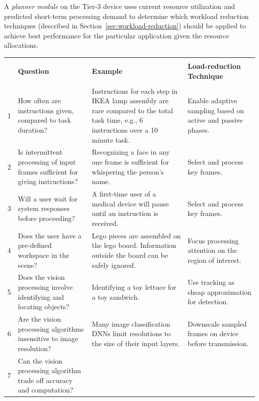 A {\em planner module} on the Tier-3 device uses current resource
utilization and predicted short-term processing demand to determine
which workload reduction techniques (described in
Section~\ref{sec:workload-reduction}) should be applied to achieve
best performance for the particular application given the resource
allocations.

\begin{table}[]
    \small
    \begin{tabular}{|r|p{35ex}|p{43ex}|p{32ex}|}
    \hline&&&\\[0.1in]
    &{\normalsize\bf Question}  & {\normalsize\bf Example} & {\normalsize\bf Load-reduction Technique} \\
    & & & \\ 
    \hline
    1&How often are instructions given, compared to task duration? 
        & Instructions for each step in IKEA lamp assembly are 
            rare compared to the total task time, e.g., 6 instructions over 
            a 10 minute task.
        & Enable adaptive sampling based on active and passive phases. \\ \hline
    2&Is intermittent processing of input frames sufficient for giving instructions?
        & Recognizing a face in any one frame is sufficient for
whispering the person's name.
        & Select and process key frames.  \\ \hline
    3&Will a user wait for system responses before proceeding?  
        & A first-time user of a medical device will pause until  an instruction is received.
        & Select and process key frames. \\ \hline
    4&Does the user have a pre-defined workspace in the scene?
        & Lego pieces are assembled on the lego board. Information outside the board can
             be safely ignored.
        & Focus processing attention on the region of interest. \\ \hline
    5&Does the vision processing involve identifying and locating objects?
        & Identifying a toy lettuce for a toy sandwich.
        & Use tracking as cheap approximation for detection. \\ \hline
    6&Are the vision processing algorithms insensitive to image resolution?
        & Many image classification DNNs limit resolutions to  
            the size of their input layers.
        & Downscale sampled frames on device before transmission.    \\ \hline
    7&Can the vision processing algorithm trade off accuracy and computation? 

\end{tabular}
\end{table}

